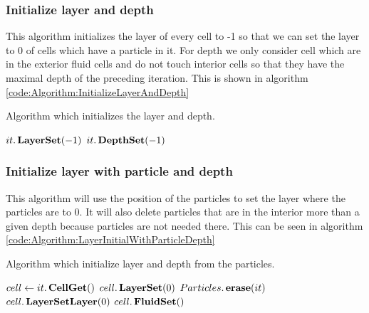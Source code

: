 \subsubsection{Initialize layer and depth}

This algorithm initializes the layer of every cell to -1 so that we can set the layer to 0 of cells which have a particle in it.
For depth we only consider cell which are in the exterior fluid cells and do not touch interior cells so that they have the maximal depth
of the preceding iteration.
This is shown in algorithm \ref{code:Algorithm:InitializeLayerAndDepth}

\begin{algorithm}
\caption{Algorithm which initializes the layer and depth.}
\label{code:Algorithm:InitializeLayerAndDepth}
\begin{algorithmic}[1]
			\State $it.\mathop{\textbf{LayerSet}}(-1)$
			 
				\State $it.\mathop{\textbf{DepthSet}}(-1)$ 
			\EndIf
\EndFor
\EndProcedure
\end{algorithmic}
\end{algorithm}

\subsubsection{Initialize layer with particle and depth}

This algorithm will use the position of the particles to set the layer where the particles are to $0$.
It will also delete particles that are in the interior more than a given depth because particles are not needed there.
This can be seen in algorithm \ref{code:Algorithm:LayerInitialWithParticleDepth}

\begin{algorithm}
\caption{Algorithm which initialize layer and depth from the particles.}
\label{code:Algorithm:LayerInitialWithParticleDepth}
\begin{algorithmic}[1]
 
\State $cell \gets it.\mathop{\textbf{CellGet}}()$ 
				\State $cell.\mathop{\textbf{LayerSet}}(0)$
				 
					\State $Particles.\mathop{\textbf{erase}}(it)$ 
				\EndIf
			\Else
				\State $cell.\mathop{\textbf{LayerSetLayer}}(0)$
				\State $cell.\mathop{\textbf{FluidSet}}()$ 
			\EndIf
\EndFor
\EndProcedure
\end{algorithmic}
\end{algorithm}

